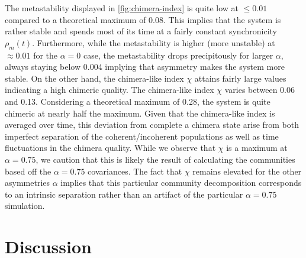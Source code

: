 \documentclass[pdflatex,lineno,referee,sn-mathphys-ay]{sn-jnl}
\begin{document}
The metastability displayed in \cref{fig:chimera-index}
is quite low at $\le \num{0.01}$ compared
to a theoretical maximum of \num{0.08}.
This implies that the system is rather stable
and spends most of its time at a fairly constant
synchronicity $\rho_m(t)$.
Furthermore, while the metastability is higher (more unstable)
at $\approx \num{0.01}$ for the $\alpha = 0$ case,
the metastability drops precipitously for larger $\alpha$,
always staying below \num{0.004} implying that
asymmetry makes the system more stable.
On the other hand, the chimera-like index $\chi$
attains fairly large values indicating a high chimeric quality.
The chimera-like index $\chi$ varies between \num{0.06} and \num{0.13}.
Considering a theoretical maximum of \num{0.28},
the system is quite chimeric at nearly half the maximum.
Given that the chimera-like index is averaged over time,
this deviation from complete a chimera state
arise from both imperfect separation of the coherent/incoherent populations
as well as time fluctuations in the chimera quality.
While we observe that $\chi$ is a maximum at $\alpha = \num{0.75}$,
we caution that this is likely the result of calculating the communities
based off the $\alpha = \num{0.75}$ covariances.
The fact that $\chi$ remains elevated for the other asymmetries $\alpha$
implies that this particular community decomposition
corresponds to an intrinsic separation rather than an artifact
of the particular $\alpha = \num{0.75}$ simulation.

\section{Discussion}
\label{sec:discussion}

\begin{figure}
  \centering
  
  \caption{
  }
  \label{fig:phase-diagram}
\end{figure}
\end{document}
